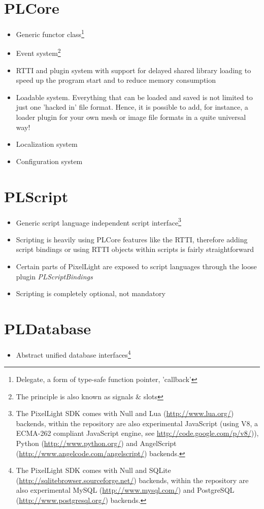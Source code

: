 \section{PLCore}
\begin{itemize}
\item{Generic functor class\footnote{Delegate, a form of type-safe function pointer, 'callback'}}
\item{Event system\footnote{The principle is also known as signals \& slots}}
\item{RTTI and plugin system with support for delayed shared library loading to speed up the program start and to reduce memory consumption}
\item{Loadable system. Everything that can be loaded and saved is not limited to just one 'hacked in' file format. Hence, it is possible to add, for instance, a loader plugin for your own mesh or image file formats in a quite universal way!}
\item{Localization system}
\item{Configuration system}
\end{itemize}




\section{PLScript}
\begin{itemize}
\item{Generic script language independent script interface\footnote{The PixelLight SDK comes with Null and Lua (\url{http://www.lua.org/}) backends, within the repository are also experimental JavaScript (using V8, a ECMA-262 compliant JavaScript engine, see \url{http://code.google.com/p/v8/})), Python (\url{http://www.python.org/}) and AngelScript (\url{http://www.angelcode.com/angelscript/}) backends.}}
\item{Scripting is heavily using PLCore features like the RTTI, therefore adding script bindings or using RTTI objects within scripts is fairly straightforward}
\item{Certain parts of PixelLight are exposed to script languages through the loose plugin \emph{PLScriptBindings}}
\item{Scripting is completely optional, not mandatory}
\end{itemize}




\section{PLDatabase}
\begin{itemize}
\item{Abstract unified database interfaces\footnote{The PixelLight SDK comes with Null and SQLite (\url{http://sqlitebrowser.sourceforge.net/}) backends, within the repository are also experimental MySQL (\url{http://www.mysql.com/}) and PostgreSQL (\url{http://www.postgresql.org/}) backends.}}
\end{itemize}




